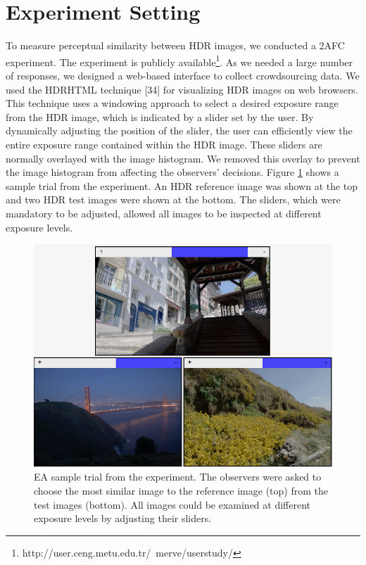 \section{Experiment Setting}
To measure perceptual similarity between HDR images, we conducted a 2AFC experiment. The experiment is publicly available\footnote{http://user.ceng.metu.edu.tr/~merve/userstudy/}. As we needed a large number of responses, we designed a web-based interface to collect crowdsourcing data. We used the HDRHTML technique [34] for visualizing HDR images on web browsers. This technique uses a windowing approach to select a desired exposure range from the HDR image, which is indicated by a slider set by the user. By dynamically adjusting the position of the slider, the user can efficiently view the entire exposure range contained within the HDR image. These sliders are normally overlayed with the image histogram. We removed this overlay to prevent the image histogram from affecting the observers’ decisions. Figure \ref{fig:experiment} shows a sample trial from the experiment. An HDR reference image was shown at the top and two HDR test images were shown at the bottom. The sliders, which were mandatory to be adjusted, allowed all images to be inspected at different exposure levels.

\begin{figure}
\begin{center}
\includegraphics[width=\textwidth]{figures/chapter3/experiment.png}
\caption{EA sample trial from the experiment. The observers were asked to choose the most similar image to the reference image (top) from the test images (bottom). All images could be examined at different exposure levels by adjusting their sliders.
}
\label{fig:experiment}
\end{center}
\end{figure}

